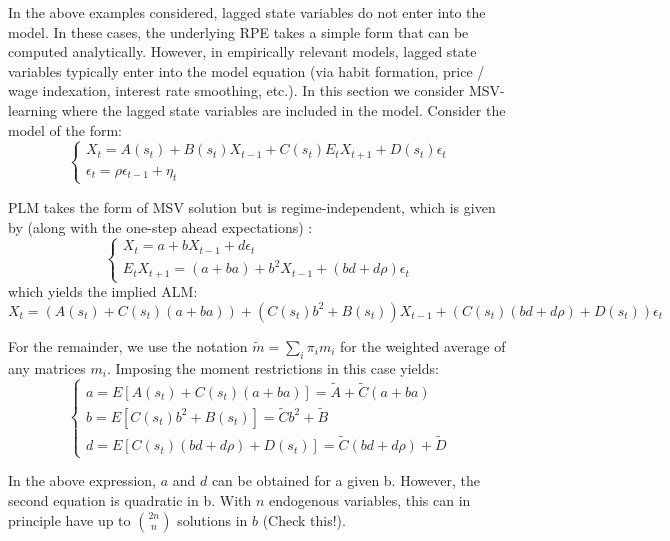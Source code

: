 \documentclass[12pt,reqno]{article}
\numberwithin{equation}{section}
\begin{document}
In the above examples considered, lagged state variables do not enter into the model. In these cases, the underlying RPE takes a simple form that can be computed analytically. However, in empirically relevant models, lagged state variables typically enter into the model equation (via habit formation, price / wage indexation, interest rate smoothing, etc.). In this section we consider MSV-learning where the lagged state variables are included in the model. Consider the model of the form: \\

$$
\begin{cases}
X_t = A(s_t) + B(s_t) X_{t-1} + C(s_t) E_t X_{t+1} + D(s_t) \epsilon_t \\
\epsilon_t = \rho \epsilon_{t-1} + \eta_t 
\end{cases}
$$

PLM takes the form of MSV solution but is regime-independent, which is given by (along with the one-step ahead expectations) : \\

$$
\begin{cases}
X_t = a + b X_{t-1} + d \epsilon_t \\
E_t X_{t+1} = (a+ba) + b^2 X_{t-1} + (bd + d\rho) \epsilon_t 
\end{cases}
$$
which yields the implied ALM: \\

$$
X_t = ( A(s_t) + C(s_t) (a+ba) ) + (C(s_t) b^2 + B(s_t))X_{t-1} + ( C(s_t) (bd +d \rho ) + D(s_t) ) \epsilon_t 
$$

For the remainder, we use the notation $\tilde{m} = \sum_i \pi_i m_i $ for the weighted average of any matrices $m_i $. Imposing the moment restrictions in this case yields: \\

$$
\begin{cases}
a = E[ A(s_t) + C(s_t)  (a+ba)]= \tilde{A} + \tilde{C} (a+ba) \\
b=E[C(s_t) b^2 + B(s_t)]=\tilde{C} b^2 + \tilde{B} \\
d = E[C(s_t) (bd+d \rho) + D(s_t)] = \tilde{C} (bd + d \rho ) + \tilde{D} 
\end{cases}
$$

In the above expression, $ a $ and $ d $ can be obtained for a given b. However, the second equation is quadratic in b. With $n $ endogenous variables, this can in principle have up to $ {2n}\choose{n} $ solutions in $b$ (Check this!). \\
\end{document}

